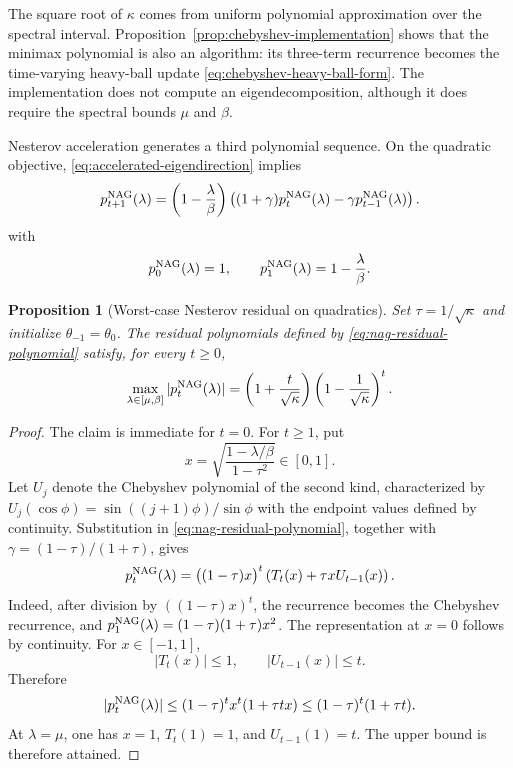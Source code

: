 \documentclass[11pt,twoside]{article}
\newtheorem{proposition}[theorem]{Proposition}
\theoremstyle{definition}
\theoremstyle{remark}
\begin{document}
The square root of $\kappa$ comes from uniform polynomial approximation over
the spectral interval. Proposition~\ref{prop:chebyshev-implementation} shows
that the minimax polynomial is also an algorithm: its three-term recurrence
becomes the time-varying heavy-ball update
\cref{eq:chebyshev-heavy-ball-form}. The implementation does not compute an
eigendecomposition, although it does require the spectral bounds $\mu$ and
$\beta$.

Nesterov acceleration generates a third polynomial sequence. On the
quadratic objective, \cref{eq:accelerated-eigendirection} implies
\begin{equation}
 p_{t+1}^{\rm NAG}(\lambda)
 =\left(1-\frac{\lambda}{\beta}\right)
  \left((1+\gamma)p_t^{\rm NAG}(\lambda)
        -\gamma p_{t-1}^{\rm NAG}(\lambda)\right).
 \label{eq:nag-residual-polynomial}
\end{equation}
with
\begin{equation}
 p_0^{\rm NAG}(\lambda)=1,
 \qquad
 p_1^{\rm NAG}(\lambda)=1-\frac{\lambda}{\beta}.
 \label{eq:nag-residual-initial-values}
\end{equation}

\begin{proposition}[Worst-case Nesterov residual on quadratics]
\label{prop:nag-residual-bound}
Set $\tau=1/\sqrt\kappa$ and initialize $\theta_{-1}=\theta_0$. The residual
polynomials defined by \cref{eq:nag-residual-polynomial} satisfy, for every
$t\ge0$,
\begin{equation}
 \max_{\lambda\in[\mu,\beta]}
 |p_t^{\rm NAG}(\lambda)|
 =\left(1+\frac{t}{\sqrt\kappa}\right)
  \left(1-\frac1{\sqrt\kappa}\right)^t.
 \label{eq:nag-residual-bound}
\end{equation}
\end{proposition}

\begin{proof}
The claim is immediate for $t=0$. For $t\ge1$, put
\[
 x=\sqrt{\frac{1-\lambda/\beta}{1-\tau^2}}\in[0,1].
\]
Let $U_j$ denote the Chebyshev polynomial of the second kind, characterized by
$U_j(\cos\phi)=\sin((j+1)\phi)/\sin\phi$ with the endpoint values defined by
continuity. Substitution in \cref{eq:nag-residual-polynomial}, together with
$\gamma=(1-\tau)/(1+\tau)$, gives
\begin{equation}
 p_t^{\rm NAG}(\lambda)
 =\bigl((1-\tau)x\bigr)^t
  \left(T_t(x)+\tau xU_{t-1}(x)\right).
 \label{eq:nag-chebyshev-representation}
\end{equation}
Indeed, after division by $((1-\tau)x)^t$, the recurrence becomes the
Chebyshev recurrence, and
$p_1^{\rm NAG}(\lambda)=(1-\tau)(1+\tau)x^2$.
The representation at $x=0$ follows by continuity.
For $x\in[-1,1]$,
\[
 |T_t(x)|\le1,
 \qquad
 |U_{t-1}(x)|\le t.
\]
Therefore
\[
 |p_t^{\rm NAG}(\lambda)|
 \le (1-\tau)^t x^t(1+\tau tx)
 \le (1-\tau)^t(1+\tau t).
\]
At $\lambda=\mu$, one has $x=1$, $T_t(1)=1$, and $U_{t-1}(1)=t$.
The upper bound is therefore attained.
\end{proof}
\end{document}
